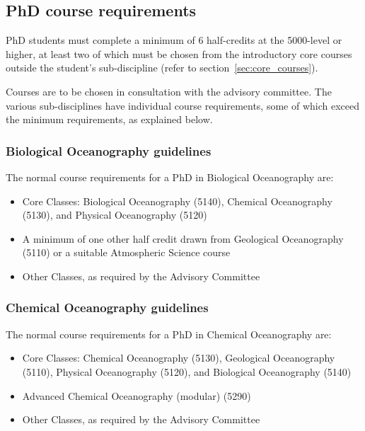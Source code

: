 \documentclass{article}
\begin{document}
\subsection{PhD course requirements}

PhD students must complete a minimum of 6 half-credits at the 5000-level or
higher, at least two of which must be chosen from the introductory core courses
outside the student’s sub-discipline (refer to section~\ref{sec:core_courses}).


Courses are to be chosen in consultation with the advisory committee. The
various sub-disciplines have individual course requirements, some of which
exceed the minimum requirements, as explained below.

\subsubsection{Biological Oceanography guidelines}

The normal course requirements for a PhD in Biological Oceanography are:
\begin{itemize}
\item Core Classes: Biological Oceanography (5140), Chemical Oceanography (5130), and Physical Oceanography (5120)
\item A minimum of one other half credit drawn from Geological Oceanography (5110) or a suitable Atmospheric Science course
\item Other Classes, as required by the Advisory Committee
\end{itemize}

\subsubsection{Chemical Oceanography guidelines}

The normal course requirements for a PhD in Chemical Oceanography are:

\begin{itemize}
\item Core Classes: Chemical Oceanography (5130), Geological Oceanography (5110), Physical Oceanography (5120), and Biological Oceanography (5140)
\item Advanced Chemical Oceanography (modular) (5290)
\item Other Classes, as required by the Advisory Committee
\end{itemize}
\end{document}
